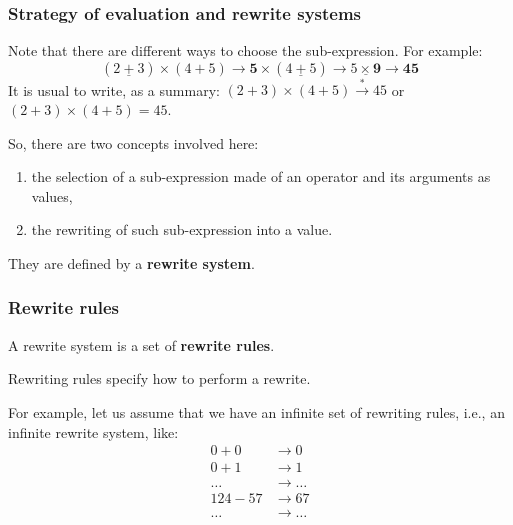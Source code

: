 %
\begin{frame}
\frametitle{Strategy of evaluation and rewrite systems}

Note that there are different ways to choose the sub-expression. For
example:
\[
(\underline{2+3}) \times (4+5) \rightarrow \textbf{5} \times
(\underline{4+5}) \rightarrow \underline{5 \times \textbf{9}}
\rightarrow \textbf{45}
\]
It is usual to write, as a summary: \((2+3)\times(4+5)
\xrightarrow{*} 45\) or \((2+3)\times(4+5)=45\).

\bigskip

So, there are two concepts involved here:
\begin{enumerate}

  \item the selection of a sub-expression made of an operator and its
    arguments as values,

  \item the rewriting of such sub-expression into a value.

\end{enumerate}

They are defined by a \textbf{rewrite system}.

\end{frame}

%
\begin{frame}
\frametitle{Rewrite rules}

A rewrite system is a set of \textbf{rewrite rules}. 

\bigskip

Rewriting rules specify how to perform a rewrite.

\bigskip

For example, let us assume that we have an infinite set of rewriting
rules, i.e., an infinite rewrite system, like:
\begin{align*}
0 + 0 & \rightarrow 0\\
0 + 1 & \rightarrow 1\\
\dots & \rightarrow \dots\\
124 - 57 & \rightarrow 67\\
\dots & \rightarrow \dots
\end{align*}

\end{frame}

